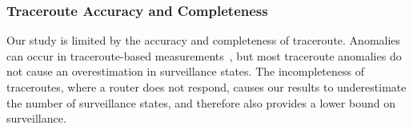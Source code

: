 \subsubsection{Traceroute Accuracy and Completeness}
Our study is limited by the accuracy and completeness of traceroute.  Anomalies can occur in traceroute-based measurements~\cite{augustin2006avoiding}, but most traceroute anomalies do not cause an overestimation in surveillance states.  The incompleteness of traceroutes, where a router does not respond, causes our results to underestimate the number of surveillance states, and therefore also provides a lower bound on surveillance.
